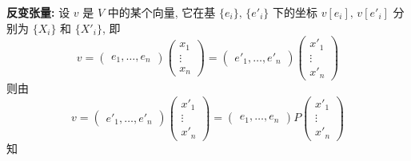 \documentclass{book}
\begin{document}
        \textbf{反变张量: }设 $v$ 是 $V$ 中的某个向量, 它在基 $\{e_i\},\,\{{e'}_i\}$ 下的坐标 $v[e_i],\,v[{e'}_i]$ 分别为 $\{X_i\}$ 和 $\{{X'}_i\}$, 即
        \begin{equation*}
            v = 
            \begin{pmatrix}
                e_1,\dots,e_n
            \end{pmatrix}
            \begin{pmatrix}
                x_1 \\ \vdots \\ x_n
            \end{pmatrix} = 
            \begin{pmatrix}
                {e'}_1,\dots,{e'}_n
            \end{pmatrix}
            \begin{pmatrix}
                {x'}_1 \\ \vdots \\ {x'}_n
            \end{pmatrix}
        \end{equation*}
        则由
        \begin{equation*}
            v = 
            \begin{pmatrix}
                {e'}_1,\dots,{e'}_n
            \end{pmatrix}
            \begin{pmatrix}
                {x'}_1 \\ \vdots \\ {x'}_n
            \end{pmatrix} = 
            \begin{pmatrix}
                e_1,\dots,e_n
            \end{pmatrix}
            P
            \begin{pmatrix}
                {x'}_1 \\ \vdots \\ {x'}_n
            \end{pmatrix}
        \end{equation*}
        知
\end{document}
